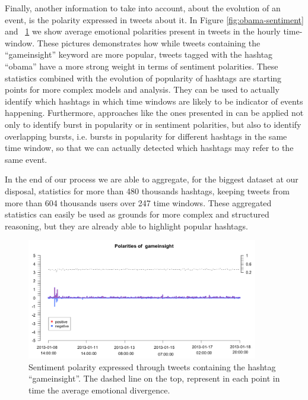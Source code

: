 Finally, another information to take into account, about the evolution of an event, is the polarity expressed in tweets about it.
In Figure \ref{fig:obama-sentiment} and ~\ref{fig:game-sentiment} we show average emotional polarities present in tweets in the hourly time-window.
These pictures demonstrates how while tweets containing the ``gameinsight'' keyword are more popular, tweets tagged with the hashtag ``obama'' have a more strong weight in terms of sentiment polarities.
These statistics combined with the evolution of popularity of hashtags are starting points for more complex models and analysis.
They can be used to actually identify which hashtags in which time windows are likely to be indicator of events happening.
Furthermore, approaches like the ones presented in \cite{Vlachos:2004:ISP:1007568.1007586} can be applied not only to identify burst in popularity or in sentiment polarities, but also to identify overlapping bursts, i.e. bursts in popularity for different hashtags in the same time window, so that we can actually detected which hashtags may refer to the same event.

In the end of our process we are able to aggregate, for the biggest dataset at our disposal, statistics for  more than 480 thousands hashtags, keeping tweets from more than 604 thousands users over 247 time windows.
These aggregated statistics can easily be used as grounds for more complex and structured reasoning, but they are already able to highlight popular hashtags.


\begin{figure}[!Ht]
\includegraphics[width=0.9\textwidth]{images/game-sentiment.png} 
\caption{Sentiment polarity expressed through tweets containing the hashtag ``gameinsight''. The dashed line on the top, represent in each point in time the average emotional divergence.}
\label{fig:game-sentiment}
\end{figure}






